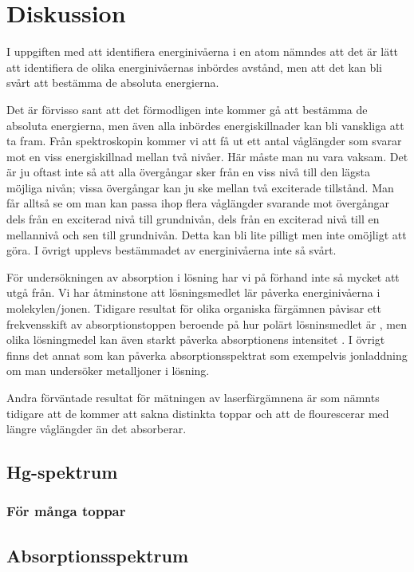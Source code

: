 \documentclass[11pt,a4paper]{article}
\begin{document}
\section{Diskussion}
I uppgiften med att identifiera energinivåerna i en atom nämndes att
det är lätt att identifiera de olika energinivåernas inbördes avstånd,
men att det kan bli svårt att bestämma de absoluta energierna. 

Det är förvisso sant att det förmodligen inte kommer gå att bestämma
de absoluta energierna, men även alla inbördes energiskillnader kan
bli vanskliga att ta fram. Från spektroskopin kommer vi att få ut ett
antal våglängder som svarar mot en viss energi\-skillnad mellan två
nivåer. Här måste man nu vara vaksam. Det är ju oftast inte så att
alla övergångar sker från en viss nivå till den lägsta möjliga nivån;
vissa övergångar kan ju ske mellan två exciterade tillstånd. Man får
alltså se om man kan passa ihop flera våglängder svarande mot
övergångar dels från en exciterad nivå till grundnivån, dels från en
exciterad nivå till en mellannivå och sen till grundnivån. Detta kan
bli lite pilligt men inte omöjligt att göra. I övrigt upplevs
bestämmadet av energinivåerna inte så svårt. 

För undersökningen av absorption i lösning har vi på förhand inte så
mycket att utgå från. Vi har åtminstone att lösningsmedlet lär påverka
energinivåerna i molekylen/jonen. Tidigare resultat för olika
organiska färgämnen påvisar ett frekvensskift av absorptionstoppen
beroende på hur polärt lösninsmedlet är \cite{Mannekutla2008}, men
olika lösningmedel kan även starkt påverka absorptionens intensitet
\cite{Homocianu2011}.
I övrigt finns det annat som kan påverka absorptionsspektrat som
exempelvis jonladdning om man undersöker metalljoner i lösning. 

Andra förväntade resultat för mätningen av laserfärgämnena är som
nämnts tidigare att de kommer att sakna distinkta toppar och att de
flourescerar med längre våglängder än det absorberar. 

\subsection{Hg-spektrum}

\subsubsection{För många toppar}

\subsection{Absorptionsspektrum}
\end{document}
